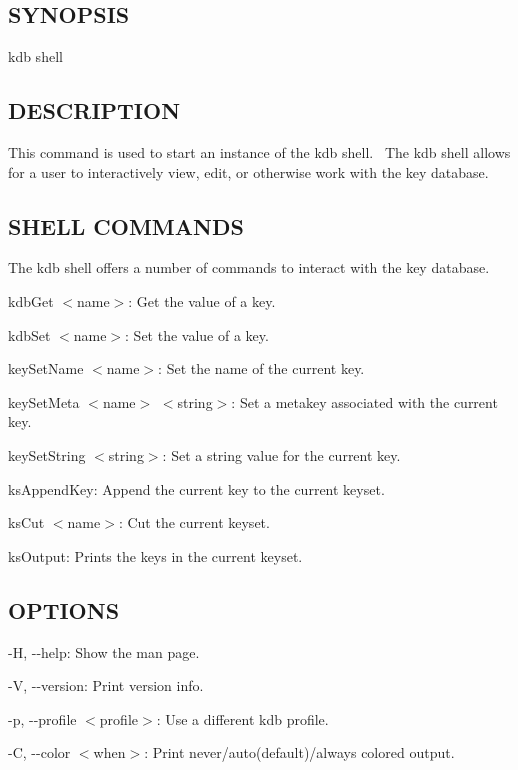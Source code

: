 \subsection*{S\+Y\+N\+O\+P\+S\+IS}

{\ttfamily kdb shell}

\subsection*{D\+E\+S\+C\+R\+I\+P\+T\+I\+ON}

This command is used to start an instance of the kdb shell.~\newline
 The kdb shell allows for a user to interactively view, edit, or otherwise work with the key database.~\newline


\subsection*{S\+H\+E\+LL C\+O\+M\+M\+A\+N\+DS}

The kdb shell offers a number of commands to interact with the key database.


\begin{DoxyItemize}
\item {\ttfamily kdb\+Get $<$name$>$}\+: Get the value of a key.
\item {\ttfamily kdb\+Set $<$name$>$}\+: Set the value of a key.
\item {\ttfamily key\+Set\+Name $<$name$>$}\+: Set the name of the current key.
\item {\ttfamily key\+Set\+Meta $<$name$>$ $<$string$>$}\+: Set a metakey associated with the current key.
\item {\ttfamily key\+Set\+String $<$string$>$}\+: Set a string value for the current key.
\item {\ttfamily ks\+Append\+Key}\+: Append the current key to the current keyset.
\item {\ttfamily ks\+Cut $<$name$>$}\+: Cut the current keyset.
\item {\ttfamily ks\+Output}\+: Prints the keys in the current keyset.
\end{DoxyItemize}

\subsection*{O\+P\+T\+I\+O\+NS}


\begin{DoxyItemize}
\item {\ttfamily -\/H}, {\ttfamily -\/-\/help}\+: Show the man page.
\item {\ttfamily -\/V}, {\ttfamily -\/-\/version}\+: Print version info.
\item {\ttfamily -\/p}, {\ttfamily -\/-\/profile $<$profile$>$}\+: Use a different kdb profile.
\item {\ttfamily -\/C}, {\ttfamily -\/-\/color $<$when$>$}\+: Print never/auto(default)/always colored output.
\end{DoxyItemize}

